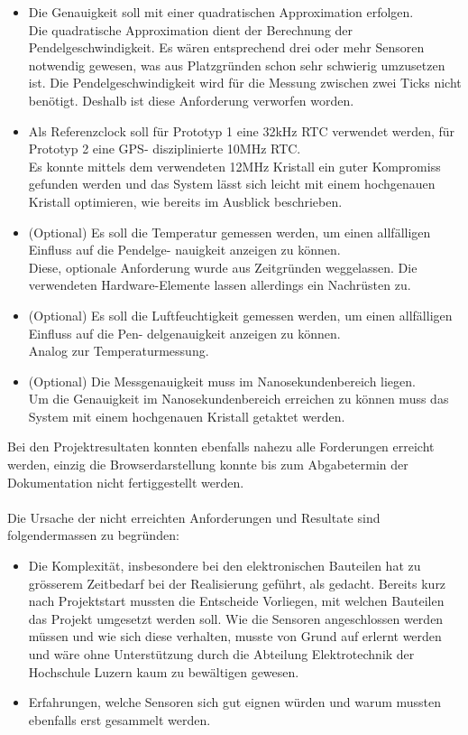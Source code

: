 \begin{itemize}
	\item Die Genauigkeit soll mit einer quadratischen Approximation erfolgen.\\
	Die quadratische Approximation dient der Berechnung der Pendelgeschwindigkeit. Es wären entsprechend drei oder mehr Sensoren notwendig gewesen, was aus Platzgründen schon sehr schwierig umzusetzen ist. Die Pendelgeschwindigkeit wird für die Messung zwischen zwei Ticks nicht benötigt. Deshalb ist diese Anforderung verworfen worden.
	\item Als Referenzclock soll für Prototyp 1 eine 32kHz RTC verwendet werden, für Prototyp 2 eine GPS-
disziplinierte 10MHz RTC.\\
	Es konnte mittels dem verwendeten 12MHz Kristall ein guter Kompromiss gefunden werden und das System lässt sich leicht mit einem hochgenauen Kristall optimieren, wie bereits im Ausblick beschrieben.
	\item (Optional) Es soll die Temperatur gemessen werden, um einen allfälligen Einfluss auf die Pendelge-
nauigkeit anzeigen zu können.\\
	Diese, optionale Anforderung wurde aus Zeitgründen weggelassen. Die verwendeten Hardware-Elemente lassen allerdings ein Nachrüsten zu.
	\item (Optional) Es soll die Luftfeuchtigkeit gemessen werden, um einen allfälligen Einfluss auf die Pen-
delgenauigkeit anzeigen zu können.\\
Analog zur Temperaturmessung.
	\item (Optional) Die Messgenauigkeit muss im Nanosekundenbereich liegen.\\
	Um die Genauigkeit im Nanosekundenbereich erreichen zu können muss das System mit einem hochgenauen Kristall getaktet werden.
\end{itemize}
Bei den Projektresultaten konnten ebenfalls nahezu alle Forderungen erreicht werden, einzig die Browserdarstellung konnte bis zum Abgabetermin der Dokumentation nicht fertiggestellt werden.\\
\\
Die Ursache der nicht erreichten Anforderungen und Resultate sind folgendermassen zu begründen:
\begin{itemize}
	\item Die Komplexität, insbesondere bei den elektronischen Bauteilen hat zu grösserem Zeitbedarf bei der Realisierung geführt, als gedacht. Bereits kurz nach Projektstart mussten die Entscheide Vorliegen, mit welchen Bauteilen das Projekt umgesetzt werden soll. Wie die Sensoren angeschlossen werden müssen und wie sich diese verhalten, musste von Grund auf erlernt werden und wäre ohne Unterstützung durch die Abteilung Elektrotechnik der Hochschule Luzern kaum zu bewältigen gewesen.
	\item Erfahrungen, welche Sensoren sich gut eignen würden und warum mussten ebenfalls erst gesammelt werden.
\end{itemize}

